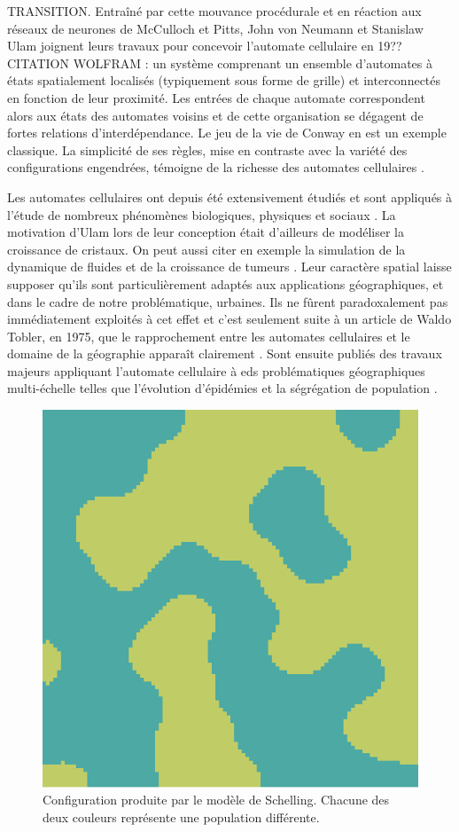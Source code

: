 \documentclass[12pt]{article}
\begin{document}
TRANSITION. Entraîné par cette mouvance procédurale et en réaction aux
réseaux de neurones de McCulloch et Pitts, John von Neumann et
Stanislaw Ulam joignent leurs travaux pour concevoir l'automate
cellulaire en 19??  CITATION WOLFRAM : un système comprenant un
ensemble d'automates à états spatialement localisés (typiquement sous
forme de grille) et interconnectés en fonction de leur proximité. Les
entrées de chaque automate correspondent alors aux états des automates
voisins et de cette organisation se dégagent de fortes relations
d'interdépendance. Le jeu de la vie de Conway en est un exemple
classique. La simplicité de ses règles, mise en contraste avec la
variété des configurations engendrées, témoigne de la richesse des
automates cellulaires \cite{Gardner1970}.

Les automates cellulaires ont depuis été extensivement étudiés et sont
appliqués à l'étude de nombreux phénomènes biologiques, physiques et
sociaux \cite{Ganguly2003}. La motivation d'Ulam lors de leur
conception était d'ailleurs de modéliser la croissance de cristaux. On
peut aussi citer en exemple la simulation de la dynamique de fluides
\cite{Frisch1986} et de la croissance de tumeurs
\cite{Kansal2000}. Leur caractère spatial laisse supposer qu'ils sont
particulièrement adaptés aux applications géographiques, et dans le
cadre de notre problématique, urbaines. Ils ne fûrent paradoxalement
pas immédiatement exploités à cet effet et c'est seulement suite à un
article de Waldo Tobler, en 1975, que le rapprochement entre les
automates cellulaires et le domaine de la géographie apparaît
clairement \cite{Tobler1975}. Sont ensuite publiés des travaux majeurs
appliquant l'automate cellulaire à eds problématiques géographiques
multi-échelle telles que l'évolution d'épidémies \cite{Fu2003} et la
ségrégation de population \cite{Schelling1969}.

\begin{figure}
  \centering
  \includegraphics[width=.6\linewidth]{images/schelling.png}
  \caption{Configuration produite par le modèle de Schelling. Chacune
    des deux couleurs représente une population différente.}
  \label{fig:schelling}
\end{figure}
\end{document}
